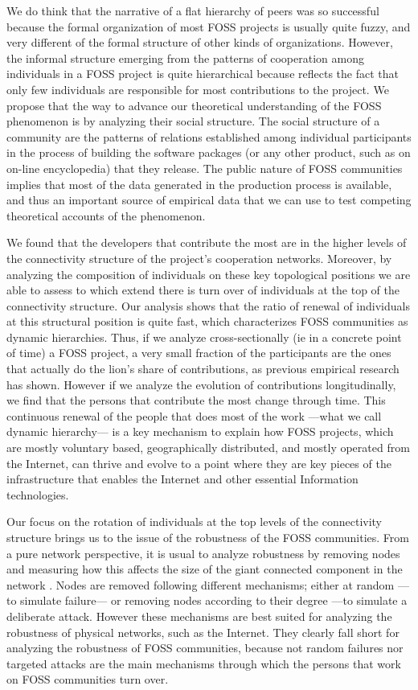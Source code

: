 We do think that the narrative of a flat hierarchy of peers was so successful because the formal organization of most FOSS projects is usually quite fuzzy, and very different of the formal structure of other kinds of organizations. However, the informal structure emerging from the patterns of cooperation among individuals in a FOSS project is quite hierarchical because reflects the fact that only few individuals are responsible for most contributions to the project. We propose that the way to advance our theoretical understanding of the FOSS phenomenon is by analyzing their social structure. The social structure of a community are the patterns of relations established among individual participants in the process of building the software packages (or any other product, such as on on-line encyclopedia) that they release. The public nature of FOSS communities implies that most of the data generated in the production process is available, and thus an important source of empirical data that we can use to test competing theoretical accounts of the phenomenon. 

We found that the developers that contribute the most are in the higher levels of the connectivity structure of the project's cooperation networks. Moreover, by analyzing the composition of individuals on these key topological positions we are able to assess to which extend there is turn over of individuals at the top of the connectivity structure. Our analysis shows that the ratio of renewal of individuals at this structural position is quite fast, which characterizes FOSS communities as dynamic hierarchies. Thus, if we analyze cross-sectionally (ie in a concrete point of time) a FOSS project, a very small fraction of the participants are the ones that actually do the lion's share of contributions, as previous empirical research has shown. However if we analyze the evolution of contributions longitudinally, we find that the persons that contribute the most change through time. This continuous renewal of the people that does most of the work ---what we call dynamic hierarchy--- is a key mechanism to explain how FOSS projects, which are mostly voluntary based, geographically distributed, and mostly operated from the Internet, can thrive and evolve to a point where they are key pieces of the infrastructure that enables the Internet and other essential Information technologies.

Our focus on the rotation of individuals at the top levels of the connectivity structure brings us to the issue of the robustness of the FOSS communities. From a pure network perspective, it is usual to analyze robustness by removing nodes and measuring how this affects the size of the giant connected component in the network \citep{albert:2000}. Nodes are removed following different mechanisms; either at random ---to simulate failure--- or removing nodes according to their degree ---to simulate a deliberate attack. However these mechanisms are best suited for analyzing the robustness of physical networks, such as the Internet. They clearly fall short for analyzing the robustness of FOSS communities, because not random failures nor targeted attacks are the main mechanisms through which the persons that work on FOSS communities turn over.

